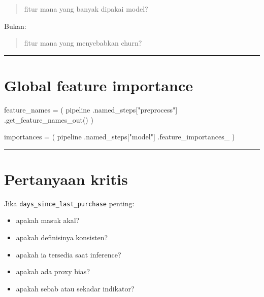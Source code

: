 \documentclass[
  indonesian,
  letterpaper,
  DIV=11,
  numbers=noendperiod]{scrreprt}
\newenvironment{Shaded}{\begin{snugshade}}{\end{snugshade}}
\newcommand{\NormalTok}[1]{\textcolor[rgb]{0.00,0.23,0.31}{#1}}
\newcommand{\OperatorTok}[1]{\textcolor[rgb]{0.37,0.37,0.37}{#1}}
\newcommand{\StringTok}[1]{\textcolor[rgb]{0.13,0.47,0.30}{#1}}
\providecommand{\tightlist}{%
  \setlength{\itemsep}{0pt}\setlength{\parskip}{0pt}}
\begin{document}
\begin{quote}
fitur mana yang banyak dipakai model?
\end{quote}

Bukan:

\begin{quote}
fitur mana yang menyebabkan churn?
\end{quote}

\begin{center}\rule{0.5\linewidth}{0.5pt}\end{center}

\section{Global feature importance}\label{global-feature-importance}

\begin{Shaded}
\begin{Highlighting}[]
\NormalTok{feature\_names }\OperatorTok{=}\NormalTok{ (}
\NormalTok{    pipeline}
\NormalTok{    .named\_steps[}\StringTok{"preprocess"}\NormalTok{]}
\NormalTok{    .get\_feature\_names\_out()}
\NormalTok{)}

\NormalTok{importances }\OperatorTok{=}\NormalTok{ (}
\NormalTok{    pipeline}
\NormalTok{    .named\_steps[}\StringTok{"model"}\NormalTok{]}
\NormalTok{    .feature\_importances\_}
\NormalTok{)}
\end{Highlighting}
\end{Shaded}

\begin{center}\rule{0.5\linewidth}{0.5pt}\end{center}

\section{Pertanyaan kritis}\label{pertanyaan-kritis}

Jika \texttt{days\_since\_last\_purchase} penting:

\begin{itemize}
\tightlist
\item
  apakah masuk akal?
\item
  apakah definisinya konsisten?
\item
  apakah ia tersedia saat inference?
\item
  apakah ada proxy bias?
\item
  apakah sebab atau sekadar indikator?
\end{itemize}
\end{document}

